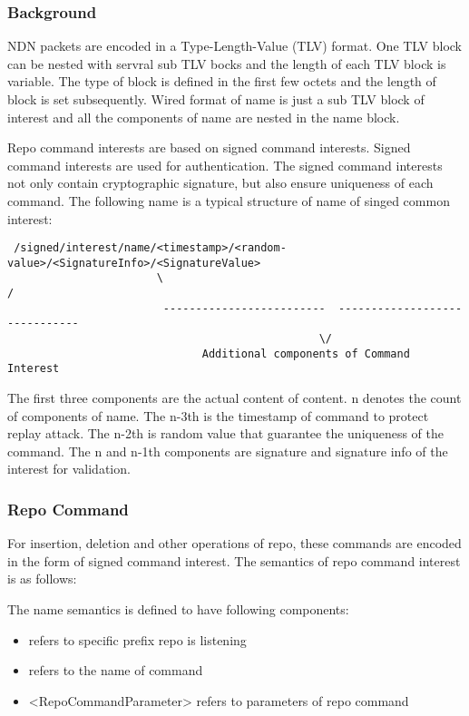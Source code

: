 \documentclass{acm_proc_article-sp}
\begin{document}
\subsubsection{Background}
NDN packets are encoded in a Type-Length-Value (TLV) format. One TLV block can be nested with servral sub TLV bocks and the length of each TLV block is variable. The type of block is defined in the first few octets and the length of block is set subsequently. Wired format of name is just a sub TLV block of interest and all the components of name are nested in the name block.

Repo command interests are based on signed command interests. Signed command interests are used for authentication. The signed command interests not only contain cryptographic signature, but also ensure uniqueness of each command. The following name is a typical structure of name of singed common interest:

\begin{figure*}[htbp]
\centering
\begin{framed}
\begin{BVerbatim}
 /signed/interest/name/<timestamp>/<random-value>/<SignatureInfo>/<SignatureValue>
                       \                                                         /
                        -------------------------  ------------------------------
                                                \/
                              Additional components of Command Interest 
\end{BVerbatim}
\end{framed}
\end{figure*}

The first three components are the actual content of content. n denotes the count of components of name. The n-3th is the timestamp of command to protect replay attack. The n-2th is random value that guarantee the uniqueness of the command. The n and n-1th components are signature and signature info of the interest for validation.

\subsubsection{Repo Command}
For insertion, deletion and other operations of repo, these commands are encoded in the form of signed command interest. The semantics of repo command interest is as follows:

The name semantics is defined to have following components:
\begin{itemize}
\item <repo prefix> refers to specific prefix repo is listening
\item <command verb> refers to the name of command
\item <RepoCommandParameter> refers to parameters of repo command
\end{itemize}
\end{document}

